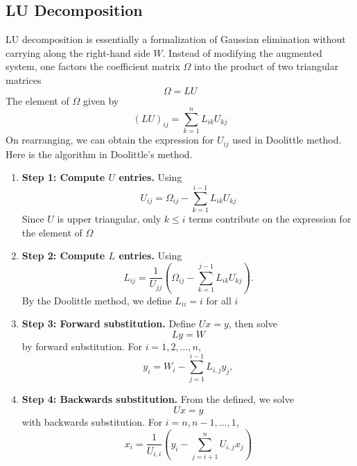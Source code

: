 \documentclass[../../../main.tex]{subfiles}
\begin{document}
\subsection{LU Decomposition}
LU decomposition is essentially a formalization of Gaussian elimination without carrying along the right-hand side $W$.
Instead of modifying the augmented system, one factors the coefficient matrix $\Omega$ into the product of two triangular matrices
\begin{equation*}
    \Omega=LU
\end{equation*}
The element of $\Omega$ given by 
\begin{equation*}
    (LU)_{ij}=\sum_{k=1 }^{n}L_{ik}U_{kj}
\end{equation*}
On rearranging, we can obtain the expression for $U_{ij}$ used in Doolittle method.
Here is the algorithm in Doolittle’s method.
\begin{enumerate}
    \item \textbf{Step 1: Compute $U$ entries.} Using
    \begin{equation*}
        U_{ij} = \Omega_{ij} - \sum_{k=1}^{i-1} L_{ik} U_{kj}
    \end{equation*}
    Since $U$ is upper triangular, only $k \leq i$ terms contribute on the expression for the element of $\Omega$
    \item \textbf{Step 2: Compute $L$ entries.} Using
    \begin{equation*}
        L_{ij} = \frac{1}{U_{jj}} \left( \Omega_{ij} - \sum_{k=1}^{j-1} L_{ik} U_{kj} \right).
    \end{equation*}
    By the Doolittle method, we define $L_{ii}=i$ for all $i$
    \item \textbf{Step 3: Forward substitution.} Define $Ux=y$, then solve
    \begin{equation*}
        Ly=W
    \end{equation*}
    by forward substitution.
    For $i = 1,2,\ldots,n$,
    \begin{equation*}
        y_i = W_i - \sum_{j=1}^{i-1} L_{i,j} y_j, 
    \end{equation*}
    \item \textbf{Step 4: Backwards substitution.} From the defined, we solve
    \begin{equation*}
        Ux=y
    \end{equation*}
    with backwards substitution.
    For $i = n, n-1, \ldots, 1$,
    \begin{equation*}
       x_i = \frac{1}{U_{i,i}} \left( y_i - \sum_{j=i+1}^{n} U_{i,j} x_j \right)
    \end{equation*}
\end{enumerate}
\end{document}
